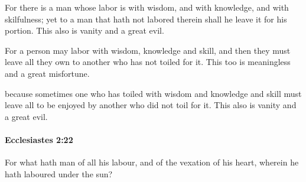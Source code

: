 			\begin{versebox}
					\item[BHS] 
					\item[LXX] 
					\item[ASV] For there is a man whose labor is with wisdom, and with knowledge, and with skilfulness; yet to a man that hath not labored therein shall he leave it for his portion. This also is vanity and a great evil.
					\item[NIV] For a person may labor with wisdom, knowledge and skill, and then they must leave all they own to another who has not toiled for it. This too is meaningless and a great misfortune.
					\item[NRSV] because sometimes one who has toiled with wisdom and knowledge and skill must leave all to be enjoyed by another who did not toil for it. This also is vanity and a great evil.
			\end{versebox}

		\paragraph{Ecclesiastes 2:22} %
			\label{ECCLESIASTES-2-22}

			For what hath man of all his labour, and of the vexation of his heart, wherein he hath laboured under the sun?

